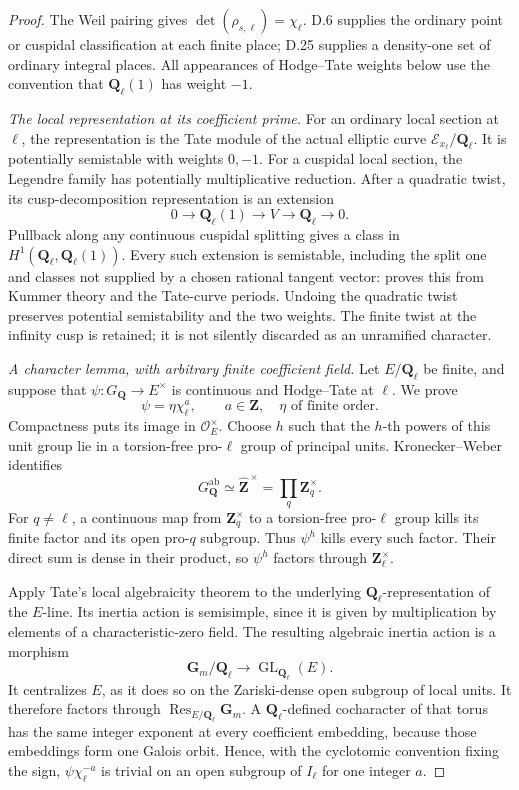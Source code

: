 \begin{proof}
The Weil pairing gives
$\det(\rho_{s,\ell})=\chi_\ell$. D.6 supplies the ordinary
point or cuspidal classification at each finite place;
D.25 supplies a density-one set of ordinary integral places.
All appearances of Hodge--Tate weights below use the
convention that $\mathbf Q_\ell(1)$ has weight $-1$.

\emph{The local representation at its coefficient prime.}
For an ordinary local section at $\ell$, the representation
is the Tate module of the actual elliptic curve
$\mathcal E_{x_\ell}/\mathbf Q_\ell$. It is potentially
semistable with weights $0,-1$.
For a cuspidal local section, the Legendre family has
potentially multiplicative reduction. After a quadratic
twist, its cusp-decomposition representation is an extension
\[
 0\longrightarrow\mathbf Q_\ell(1)\longrightarrow V
   \longrightarrow\mathbf Q_\ell\longrightarrow0.
\]
Pullback along any continuous cuspidal splitting gives a
class in $H^1(\mathbf Q_\ell,\mathbf Q_\ell(1))$.
Every such extension is semistable, including the split
one and classes not supplied by a chosen rational tangent
vector: \citet[II.4.4, pp.~18--19]{D_Berger2002} proves
this from Kummer theory and the Tate-curve periods.
Undoing the quadratic twist preserves potential
semistability and the two weights. The finite twist at
the infinity cusp is retained; it is not silently discarded
as an unramified character.

\emph{A character lemma, with arbitrary finite coefficient field.}
Let $E/\mathbf Q_\ell$ be finite, and suppose that
$\psi:G_{\mathbf Q}\to E^\times$ is continuous and
Hodge--Tate at $\ell$. We prove
\[
                 \psi=\eta\chi_\ell^a,\qquad
 a\in\mathbf Z,\quad\eta\text{ of finite order}.
 \tag{D.30.1}
\]
Compactness puts its image in $\mathcal O_E^\times$.
Choose $h$ such that the $h$-th powers of this unit group
lie in a torsion-free pro-$\ell$ group of principal units.
Kronecker--Weber identifies
\[
 G_{\mathbf Q}^{\mathrm{ab}}
  \simeq\widehat{\mathbf Z}^{\,\times}
  =\prod_q\mathbf Z_q^\times.
\]
For $q\ne\ell$, a continuous map from $\mathbf Z_q^\times$
to a torsion-free pro-$\ell$ group kills its finite factor
and its open pro-$q$ subgroup. Thus $\psi^h$ kills every
such factor. Their direct sum is dense in their product,
so $\psi^h$ factors through $\mathbf Z_\ell^\times$.

Apply Tate's local algebraicity theorem
\citep[III, Appendix A.7, Theorem~3, pp.~III-52--53]{D_Serre1989}
to the underlying $\mathbf Q_\ell$-representation of the
$E$-line. Its inertia action is semisimple, since it is
given by multiplication by elements of a characteristic-zero
field. The resulting algebraic inertia action is a morphism
\[
 \mathbf G_m/\mathbf Q_\ell
   \longrightarrow\operatorname{GL}_{\mathbf Q_\ell}(E).
\]
It centralizes $E$, as it does so on the Zariski-dense
open subgroup of local units. It therefore factors through
$\operatorname{Res}_{E/\mathbf Q_\ell}\mathbf G_m$.
A $\mathbf Q_\ell$-defined cocharacter of that torus has
the same integer exponent at every coefficient embedding,
because those embeddings form one Galois orbit. Hence,
with the cyclotomic convention fixing the sign,
$\psi\chi_\ell^{-a}$ is trivial on an open subgroup of
$I_\ell$ for one integer $a$.


\end{proof}
